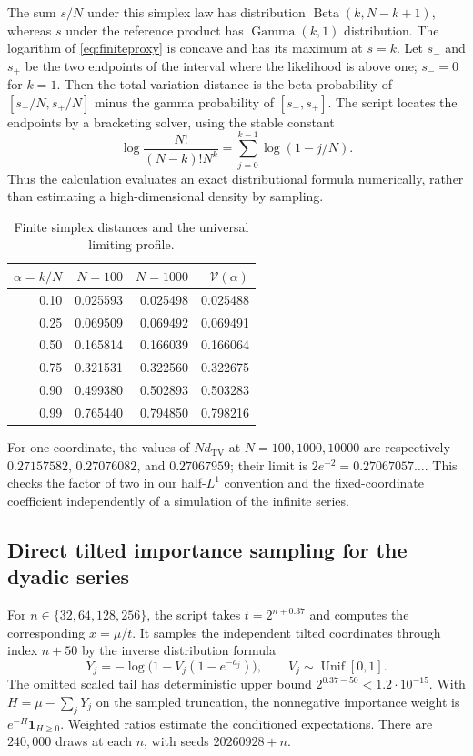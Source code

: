 \documentclass[11pt,letterpaper]{article}
\numberwithin{equation}{section}
\theoremstyle{definition}
\theoremstyle{remark}
\newcommand{\ind}{\mathbf 1}
\newcommand{\TV}{d_{\mathrm{TV}}}
\newcommand{\vp}{\mathcal V}
\begin{document}
The sum $s/N$ under this simplex law has distribution
$\operatorname{Beta}(k,N-k+1)$, whereas $s$ under the reference product has
$\operatorname{Gamma}(k,1)$ distribution. The logarithm of
\eqref{eq:finiteproxy} is concave and has its maximum at $s=k$. Let $s_-$
and $s_+$ be the two endpoints of the interval where the likelihood is above
one; $s_-=0$ for $k=1$. Then the total-variation distance is the beta
probability of $[s_-/N,s_+/N]$ minus the gamma probability of $[s_-,s_+]$.
The script locates the endpoints by a bracketing solver, using the stable
constant
\[
 \log\frac{N!}{(N-k)!N^k}=\sum_{j=0}^{k-1}\log(1-j/N).
\]
Thus the calculation evaluates an exact distributional formula numerically,
rather than estimating a high-dimensional density by sampling.

\begin{table}[htbp]
\centering
\caption{Finite simplex distances and the universal limiting profile.}
\label{tab:tv}
\begin{tabular}{rrrr}
\toprule
$\alpha=k/N$ & $N=100$ & $N=1000$ & $\vp(\alpha)$\\
\midrule
0.10 & 0.025593 & 0.025498 & 0.025488\\
0.25 & 0.069509 & 0.069492 & 0.069491\\
0.50 & 0.165814 & 0.166039 & 0.166064\\
0.75 & 0.321531 & 0.322560 & 0.322675\\
0.90 & 0.499380 & 0.502893 & 0.503283\\
0.99 & 0.765440 & 0.794850 & 0.798216\\
\bottomrule
\end{tabular}
\end{table}

For one coordinate, the values of $N\TV$ at
$N=100,1000,10000$ are respectively
$0.27157582$, $0.27076082$, and $0.27067959$; their limit is
$2e^{-2}=0.27067057\ldots$. This checks the factor of two in our
half-$L^1$ convention and the fixed-coordinate coefficient independently
of a simulation of the infinite series.

\subsection{Direct tilted importance sampling for the dyadic series}

For $n\in\{32,64,128,256\}$, the script takes $t=2^{n+0.37}$ and computes
the corresponding $x=\mu/t$. It samples the independent tilted coordinates
through index $n+50$ by the inverse distribution formula
\begin{equation}
 Y_j=-\log\big(1-V_j(1-e^{-a_j})\big),\qquad
 V_j\sim\operatorname{Unif}[0,1].
 \label{eq:sampler}
\end{equation}
The omitted scaled tail has deterministic upper bound
$2^{0.37-50}<1.2\cdot10^{-15}$. With $H=\mu-\sum_jY_j$ on the sampled
truncation, the nonnegative importance weight is
$e^{-H}\ind_{H\ge0}$. Weighted ratios estimate the conditioned expectations.
There are $240{,}000$ draws at each $n$, with seeds $20260928+n$.
\end{document}
